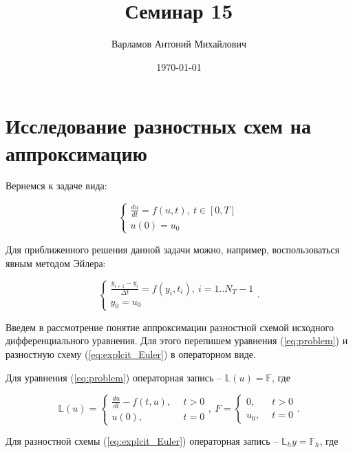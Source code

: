 \documentclass[10pt,a4paper]{article}
\title{Семинар 15}
\date{\today}
\author{Варламов Антоний Михайлович}
\begin{document}
	\maketitle
	
	\section{Исследование разностных схем на аппроксимацию}
	
	Вернемся к задаче вида:
	
	\begin{equation}\label{eq:problem}
		\begin{cases}
			\frac{d{u}}{dt} = {f}\left(u, t\right), \ t\in[0, T]
			\\
			{u}\left(0\right) = {u}_{0}
		\end{cases}
	\end{equation}
	
	Для приближенного решения данной задачи можно, например, воспользоваться 
	явным методом Эйлера:
	
	\begin{equation}\label{eq:explcit_Euler}
		\begin{cases}
			\frac{y_{i + 1} - y_{i}}{\Delta t} = {f}\left(y_{i}, t_{i}\right), \ 
			i=1..N_T-1
			\\
			y_{0} = u_{0}
		\end{cases}.
	\end{equation}
	
	Введем в рассмотрение понятие аппроксимации разностной схемой исходного 
	дифференциального уравнения.
	Для этого перепишем уравнения (\ref{eq:problem}) и разностную схему 
	(\ref{eq:explcit_Euler}) в операторном виде.
	
	Для уравнения (\ref{eq:problem}) операторная запись -- $\mathbb{L}\left(u
	\right)=\mathbb{F}$, где
	
	\begin{equation}
		\mathbb{L}\left(u\right)  = 
		\begin{cases}
			\frac{du}{dt} - f\left(t, u\right), \ \ &t > 0
			\\
			u\left(0\right) , \ \ &t = 0
		\end{cases},
		\
		F  = 
		\begin{cases}
		0, \ \ &t > 0
		\\
		u_0 , \ \ &t = 0
		\end{cases}.
	\end{equation}
	
	Для разностной схемы (\ref{eq:explcit_Euler}) операторная запись -- $
	\mathbb{L}_h y =\mathbb{F}_h$, где
	
\end{document}
